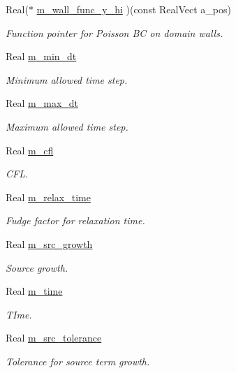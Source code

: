 \begin{DoxyCompactItemize}
Real($\ast$ \hyperlink{classtime__stepper_a6bb898a547668fa17298cf85602f4391}{m\+\_\+wall\+\_\+func\+\_\+y\+\_\+hi} )(const Real\+Vect a\+\_\+pos)
\begin{DoxyCompactList}\small\item\em Function pointer for Poisson BC on domain walls. \end{DoxyCompactList}\item 
Real \hyperlink{classtime__stepper_abe8383e525fee7b34f17634d20b8dc7b}{m\+\_\+min\+\_\+dt}
\begin{DoxyCompactList}\small\item\em Minimum allowed time step. \end{DoxyCompactList}\item 
Real \hyperlink{classtime__stepper_a0b4bb843a6ab96d3876aec7668d8ef31}{m\+\_\+max\+\_\+dt}
\begin{DoxyCompactList}\small\item\em Maximum allowed time step. \end{DoxyCompactList}\item 
Real \hyperlink{classtime__stepper_a0a66eaadfed367bc8745e9214acce772}{m\+\_\+cfl}
\begin{DoxyCompactList}\small\item\em C\+FL. \end{DoxyCompactList}\item 
Real \hyperlink{classtime__stepper_a895f7fd304fc34a7ec783b25492143df}{m\+\_\+relax\+\_\+time}
\begin{DoxyCompactList}\small\item\em Fudge factor for relaxation time. \end{DoxyCompactList}\item 
Real \hyperlink{classtime__stepper_a06ffa5dffab8e8cacef26bc640f4a265}{m\+\_\+src\+\_\+growth}
\begin{DoxyCompactList}\small\item\em Source growth. \end{DoxyCompactList}\item 
Real \hyperlink{classtime__stepper_a491c3c35019477c00296450933ca8bb4}{m\+\_\+time}
\begin{DoxyCompactList}\small\item\em T\+Ime. \end{DoxyCompactList}\item 
Real \hyperlink{classtime__stepper_a19f732138cbbb2be42a8d5486aa4208f}{m\+\_\+src\+\_\+tolerance}
\begin{DoxyCompactList}\small\item\em Tolerance for source term growth. \end{DoxyCompactList}\item 

\end{DoxyCompactItemize}
